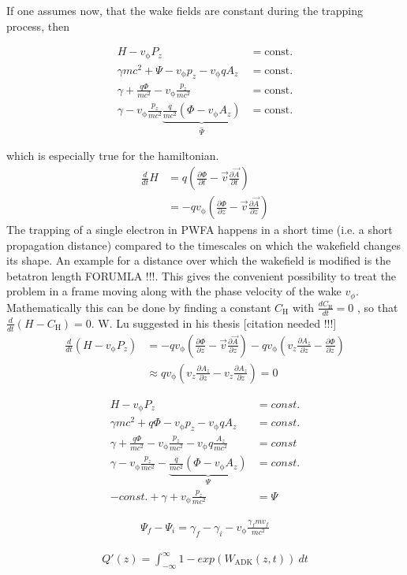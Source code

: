 \documentclass{thesis}
\begin{document}
If one assumes now, that the wake fields are constant during the trapping process, then 

\begin{align}
H-v_\mathrm{\phi}P_z &= \mathrm{const.}\\
\gamma m c^2+\Psi-v_\mathrm{\phi}p_z-v_\mathrm{\phi}qA_z &= \mathrm{const.}\\
\gamma+\frac{q \Phi}{m c^2}-v_\mathrm{\phi} \frac{p_z}{mc^2} &= \mathrm{const.}\\
\gamma - v_\mathrm{\phi} \frac{p_z}{mc^2} \underbrace{\frac{q}{mc^2}(\Phi-v_\mathrm{\phi}A_z)}_{\hat{\Psi}}  &= \mathrm{const.} 
\end{align}

which is especially true for the hamiltonian.
\begin{align*}
\frac{d}{dt}H&=q(\frac{\partial \Phi}{\partial t}-\vec{v}\frac{\partial \vec{A}}{\partial t})\\
&=-q v_\mathrm{\phi}(\frac{\partial \Phi}{\partial z}-\vec{v} \frac{\partial \vec{A}}{\partial z})
\end{align*}
The trapping of a single electron in PWFA happens in a short time (i.e. a short propagation distance) compared to the timescales on which the wakefield changes its shape. An example for a distance over which the wakefield is modified is the betatron length FORUMLA !!!.
This gives the convenient possibility to treat the problem in a frame moving along with the phase velocity of the wake $v_\phi$. Mathematically this can be done by finding a constant $C_\mathrm{H}$ with $\frac{d C_\mathrm{H}}{dt}=0$ , so that $\frac{d}{dt}(H-C_\mathrm{H})=0$.
W. Lu suggested in his thesis [citation needed !!!] 
\begin{align*}
\frac{d}{dt}(H-v_\mathrm{\phi} P_z)&=-qv_\mathrm{\phi}(\frac{\partial \Phi}{\partial z}-\vec{v}\frac{\partial \vec{A}}{\partial z})-qv_\mathrm{\phi}(v_z \frac{\partial A_z}{\partial z}-\frac{\partial \Phi}{\partial z})\\
&\approx q v_\mathrm{\phi}(v_z \frac{\partial A_z}{\partial z}-v_z \frac{\partial A_z}{\partial z})=0
\end{align*}

\begin{align*}
H-v_\mathrm{\phi}P_z&=const.\\
\gamma m c^2+q\Phi-v_\mathrm{\phi}p_z-v_\mathrm{\phi}qA_z&=const.\\
\gamma+\frac{q\Phi}{mc^2}-v_\mathrm{\phi}\frac{p_z}{mc^2}-v_\mathrm{\phi}q\frac{A_z}{mc^2}&=const\\
\gamma-v_\mathrm{\phi}\frac{p_z}{mc^2}-\underbrace{\frac{q}{mc^2}(\Phi-v_\mathrm{\phi}A_z)}_{\Psi}&=const.\\
-const. +\gamma + v_\mathrm{\phi}\frac{p_z}{mc^2}&=\Psi
\end{align*}

\begin{align*}
\Psi_f-\Psi_i=\gamma_f-\gamma_i-v_\mathrm{\phi}\frac{\gamma_f m v_f}{mc^2}
\end{align*}

\begin{align*}
Q'(z)=\int_{-\infty}^{\infty}1- exp(W_\mathrm{ADK}(z,t))\ dt
\end{align*}



    
\end{document}
